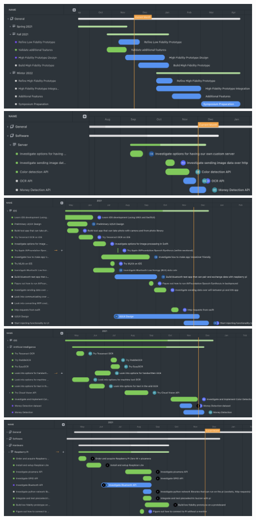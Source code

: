 \documentclass[a4paper,11pt]{article}
\begin{document}
\begin{center}
    \includegraphics[width={1.0\linewidth}]{img/schedule/general-gantt.png}
    \includegraphics[width={1.0\linewidth}]{img/schedule/software-gantt-1.png}
    \includegraphics[width={1.0\linewidth}]{img/schedule/software-gantt-2.png}
    \includegraphics[width={1.0\linewidth}]{img/schedule/software-gantt-3.png}
    \includegraphics[width={1.0\linewidth}]{img/schedule/hardware-gantt.png}
\end{center}
\end{document}
